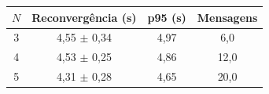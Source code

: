 \begin{tabular}{cccc}
\toprule
$N$ & Reconvergência (s) & p95 (s) & Mensagens \\
\midrule
3 & 4,55 $\pm$ 0,34 & 4,97 & 6,0 \\
4 & 4,53 $\pm$ 0,25 & 4,86 & 12,0 \\
5 & 4,31 $\pm$ 0,28 & 4,65 & 20,0 \\
\bottomrule
\end{tabular}